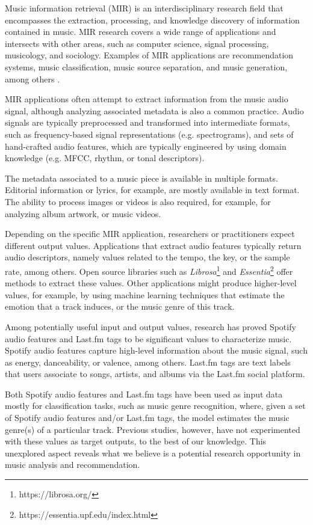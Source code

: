 \documentclass[sn-mathphys]{sn-jnl}%
\theoremstyle{thmstyleone}%
\theoremstyle{thmstyletwo}%
\theoremstyle{thmstylethree}%
\begin{document}
Music information retrieval (MIR) is an interdisciplinary research field that encompasses the extraction,
processing, and knowledge discovery of information contained in music.
MIR research covers a wide range of applications and intersects with other areas, such as computer science, signal processing, musicology, and sociology.
Examples of MIR applications are recommendation systems, music classification,
music source separation, and music generation, among others \cite{ramirez2020machine}.

MIR applications often attempt to extract information from the music audio signal,
although analyzing associated metadata is also a common practice.
Audio signals are typically preprocessed and transformed into intermediate formats, such as frequency-based signal representations (e.g. spectrograms),
and sets of hand-crafted audio features, which are typically engineered by using domain knowledge (e.g. MFCC, rhythm, or tonal descriptors).

The metadata associated to a music piece is available in multiple formats.
Editorial information or lyrics, for example, are mostly available in text format.
The ability to process images or videos is also required, for example, for analyzing album artwork, or music videos.

Depending on the specific MIR application, researchers or practitioners expect different output values.
Applications that extract audio features typically return audio descriptors, namely values related to the tempo, the key, or the sample rate, among others.
Open source libraries such as \emph{Librosa}\footnote[1]{https://librosa.org/}
and \emph{Essentia}\footnote[2]{https://essentia.upf.edu/index.html} offer methods to extract these values.
Other applications might produce higher-level values, for example, by using machine learning techniques
that estimate the emotion that a track induces, or the music genre of this track.

Among potentially useful input and output values, research has proved Spotify audio features and Last.fm tags to be significant values to characterize music.
Spotify audio features capture high-level information about the music signal,
such as energy, danceability, or valence, among others.
Last.fm tags are text labels that users associate to songs, artists, and albums via the Last.fm social platform.

Both Spotify audio features and Last.fm tags have been used as input data mostly for classification tasks, such as music genre recognition,
where, given a set of Spotify audio features and/or Last.fm tags, the model estimates the music genre(s) of a particular track.
Previous studies, however, have not experimented with these values as target outputs, to the best of our knowledge.
This unexplored aspect reveals what we believe is a potential research opportunity in music analysis and recommendation.
\end{document}
